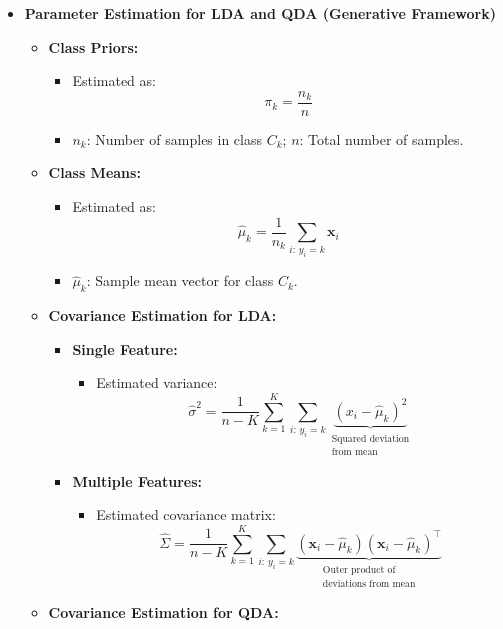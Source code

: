\documentclass[10pt]{article}
\begin{document}
\begin{itemize}
    \item \textbf{Parameter Estimation for LDA and QDA (Generative Framework)}
    \begin{itemize}
        \item \textbf{Class Priors:}
        \begin{itemize}
            \item Estimated as:
            \[
            \pi_k = \frac{n_k}{n}
            \]
            \item \(n_k\): Number of samples in class \(C_k\); \(n\): Total number of samples.
        \end{itemize}
        \item \textbf{Class Means:}
        \begin{itemize}
            \item Estimated as:
            \[
            \hat{\mu}_k = \frac{1}{n_k}\sum_{i:\,y_i=k}\boldsymbol{x}_i
            \]
            \item \(\hat{\mu}_k\): Sample mean vector for class \(C_k\).
        \end{itemize}
        \item \textbf{Covariance Estimation for LDA:}
        \begin{itemize}
            \item \textbf{Single Feature:}
            \begin{itemize}
                \item Estimated variance:
                \[
                \hat{\sigma}^2 = \frac{1}{n-K}\sum_{k=1}^K\sum_{i:\,y_i=k}\underbrace{(x_i-\hat{\mu}_k)^2}_{\substack{\text{Squared deviation} \\ \text{from mean}}}
                \]
            \end{itemize}
            \item \textbf{Multiple Features:}
            \begin{itemize}
                \item Estimated covariance matrix:
                \[
                \hat{\Sigma} = \frac{1}{n-K}\sum_{k=1}^K\sum_{i:\,y_i=k}\underbrace{(\boldsymbol{x}_i-\hat{\mu}_k)(\boldsymbol{x}_i-\hat{\mu}_k)^\top}_{\substack{\text{Outer product of} \\ \text{deviations from mean}}}
                \]
            \end{itemize}
        \end{itemize}
        \item \textbf{Covariance Estimation for QDA:}

\end{itemize}
\end{itemize}
\end{document}
